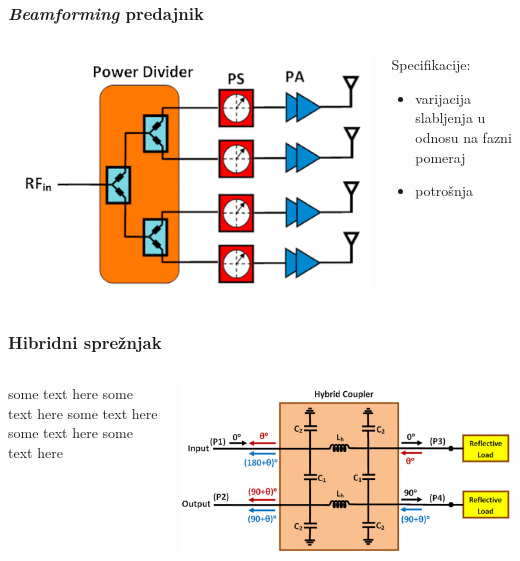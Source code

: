 \documentclass{beamer}
\begin{document}
\begin{frame}
\frametitle{\textit{Beamforming} predajnik}
\begin{columns}
  \begin{column}{0.5\textwidth}
    \includegraphics[width=\linewidth]{beam_forming_transmitter.png}
  \end{column}
  \begin{column}{0.5\textwidth}
    Specifikacije:
    \begin{itemize}
      \item varijacija slabljenja u odnosu na fazni pomeraj
      \item potrošnja 
    \end{itemize}
  \end{column}
\end{columns}
\end{frame}


\begin{frame}
\frametitle{Hibridni sprežnjak}
\begin{columns}
\begin{column}{0.5\textwidth}
   some text here some text here some text here some text here some text here
\end{column}
\begin{column}{0.5\textwidth}  
    \begin{center}
     \includegraphics[width=\textwidth]{hybrid_coupler.png}
     \end{center}
\end{column}
\end{columns}
\end{frame}
\end{document}
